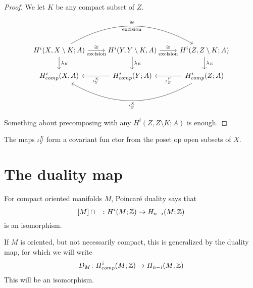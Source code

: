 \documentclass[language=english]{TemplateLecture}
\begin{document}
\begin{proof}
    We let \(K\) be any compact subset of \(Z\).

    \[\begin{tikzcd}
        {H^i(X, X\setminus K;A)} \ar[r, "\cong", "\text{excision}"'] \ar[d, "\lambda_K"] \ar[rr, bend left, "\cong", "\text{excision}"'] & {H^i(Y, Y \setminus K, A)} \ar[r, "\cong", "\text{excision}"'] \ar[d, "\lambda_K"] & {H^i(Z, Z\setminus K; A)} \ar[d, "\lambda_K"] \\
        {H_{comp}^i(X,A)} & {H_{comp}^i(Y;A)} \ar[l, "\iota_Y^X"] & {H_{comp}^i(Z;A)} \ar[l, "\iota_Z^Y"] \ar[ll, bend left, "\iota_Z^X"] \\
    \end{tikzcd}\]

    Something about precomposing with any \(H^i(Z, Z\setminus K; A)\) is enough.
\end{proof}

The maps \(\iota_Y^X\) form a covariant fun ctor from the poset op open subsets of \(X\).


\section{The duality map}

For compact oriented manifolds \(M\), Poincaré duality says that
\[[M] \cap \_ \colon H^i(M; \mathbb{Z}) \to H_{n-i}(M;\mathbb{Z})\]
is an isomorphism.

If \(M\) is oriented, but not necessarily compact, this is generalized by the duality map, for which we will write
\[D_M\colon H^i_{comp}(M;\mathbb{Z}) \to H_{n-i}(M; \mathbb{Z})\]
This will be an isomorphism.
\end{document}
